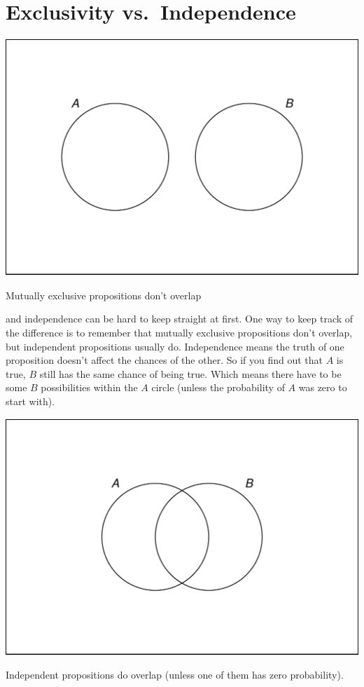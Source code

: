 \documentclass[justified]{tufte-book}
\theoremstyle{definition}
\theoremstyle{definition}
\theoremstyle{definition}
\theoremstyle{remark}
\begin{document}
\hypertarget{exclusivity-vs.independence}{%
\section{Exclusivity vs.~Independence}\label{exclusivity-vs.independence}}

\begin{marginfigure}
\includegraphics{_main_files/figure-latex/unnamed-chunk-54-1} \caption[Mutually exclusive propositions don't overlap]{Mutually exclusive propositions don't overlap}\label{fig:unnamed-chunk-54}
\end{marginfigure}

 and independence can be hard to keep straight at first. One way to keep track of the difference is to remember that mutually exclusive propositions don't overlap, but independent propositions usually do. Independence means the truth of one proposition doesn't affect the chances of the other. So if you find out that \(A\) is true, \(B\) still has the same chance of being true. Which means there have to be some \(B\) possibilities within the \(A\) circle (unless the probability of \(A\) was zero to start with).

\begin{marginfigure}
\includegraphics{_main_files/figure-latex/unnamed-chunk-55-1} \caption[Independent propositions do overlap (unless one of them has zero probability)]{Independent propositions do overlap (unless one of them has zero probability).}\label{fig:unnamed-chunk-55}
\end{marginfigure}
\end{document}

